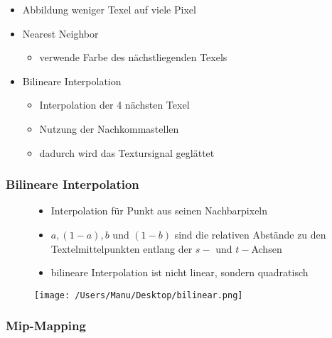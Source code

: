 \documentclass[paper=a4, fontsize=11pt]{scrartcl} %
\numberwithin{equation}{section} %
\numberwithin{figure}{section} %
\numberwithin{table}{section} %
\begin{document}
\begin{itemize}
\item Abbildung weniger Texel auf viele Pixel
\item Nearest Neighbor
\begin{itemize}
\item verwende Farbe des nächstliegenden Texels
\end{itemize}
\item Bilineare Interpolation
\begin{itemize}
\item Interpolation der 4 nächsten Texel
\item Nutzung der \glqq Nachkommastellen\grqq
\item dadurch wird das Textursignal geglättet
\end{itemize}
\end{itemize}

\subsubsection{Bilineare Interpolation}

\begin{figure}[htbp]
\begin{minipage}[t]{8cm}
\vspace{0pt}
\begin{itemize}
\item Interpolation für Punkt aus seinen Nachbarpixeln
\item $a, (1-a), b$ und $(1-b)$ sind die relativen Abstände zu den Textelmittelpunkten entlang der $s-$ und $t-$Achsen
\item bilineare Interpolation ist nicht linear, sondern quadratisch
\end{itemize}
\end{minipage}
\hfill
\begin{minipage}[t]{6cm}
\vspace{0pt}
\centering
\texttt{[image: /Users/Manu/Desktop/bilinear.png]}
\end{minipage}
\end{figure}

\subsubsection{Mip-Mapping}
\end{document}
